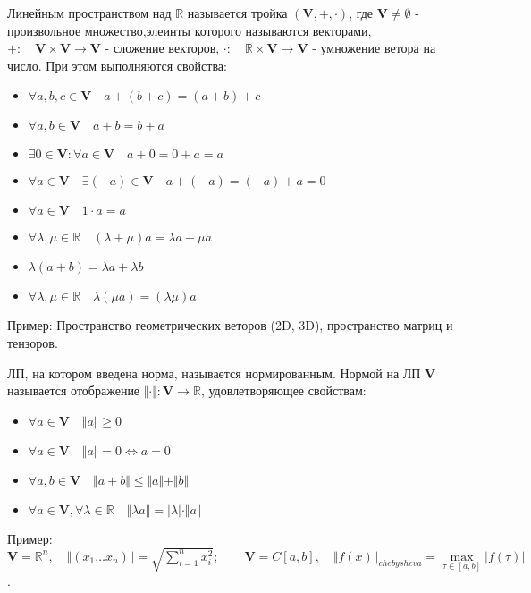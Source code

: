 \documentclass[__main__.tex]{subfiles}
\begin{document}
\begin{definition}
	Линейным пространством над $\mathbb{R}$ называется тройка $\left(\mathbf{V},+,\cdot\right)$, где $\mathbf{V}\ne\emptyset$ - произвольное множество,элеинты которого называются векторами, $+:\quad\mathbf{V}\times\mathbf{V}\rightarrow\mathbf{V}$ - сложение векторов, $\cdot:\quad\mathbb{R}\times\mathbf{V}\rightarrow\mathbf{V}$ - умножение ветора на число. При этом выполняются свойства:
	\begin{itemize}
		\item $\forall a,b,c\in\mathbf{V}\quad a+(b+c)=(a+b)+c$
		\item $\forall a,b\in\mathbf{V}\quad a+b=b+a$
		\item $\exists\bar{0}\in\mathbf{V}:\forall a\in\mathbf{V}\quad a+0=0+a=a$
		\item $\forall a\in\mathbf{V}\quad\exists(-a)\in\mathbf{V}\quad a+(-a)=(-a)+a=0$
		\item $\forall a\in\mathbf{V}\quad 1\cdot a=a$
		\item $\forall\lambda,\mu\in\mathbb{R}\quad(\lambda+\mu)a=\lambda a+\mu a$
		\item $\lambda(a+b)=\lambda a+\lambda b$
		\item $\forall\lambda,\mu\in\mathbb{R}\quad\lambda(\mu a)=(\lambda\mu)a$
	\end{itemize}
\end{definition} 
Пример: Пространство геометрических веторов (2D, 3D), пространство матриц и тензоров.
\begin{definition}
	ЛП, на котором введена норма, называется нормированным. Нормой на ЛП $\mathbf{V}$ называется отображение $\Vert\cdot\Vert:\mathbf{V}\rightarrow\mathbb{R}$, удовлетворяющее свойствам:
	\begin{itemize}
		\item $\forall a\in\mathbf{V}\quad\Vert a\Vert\ge 0$
		\item $\forall a\in\mathbf{V}\quad\Vert a\Vert=0\Leftrightarrow a=0$
		\item $\forall a,b\in\mathbf{V}\quad\Vert a+b\Vert\le\Vert a\Vert+\Vert b\Vert$
		\item $\forall a\in\mathbf{V},\forall \lambda\in\mathbb{R}\quad\Vert\lambda a\Vert=\vert\lambda\vert\cdot\Vert a\Vert$
	\end{itemize}
\end{definition}
Пример: $\mathbf{V}=\mathbb{R}^n,\quad\Vert(x_1\dots x_n)\Vert=\sqrt{\sum\limits_{i=1}^{n}x_i^2};\quad\quad\mathbf{V}=C[a,b],\quad\Vert f(x)\Vert_{chebysheva}=\max\limits_{\tau\in[a,b]}\vert f(\tau)\vert$.
\end{document}
